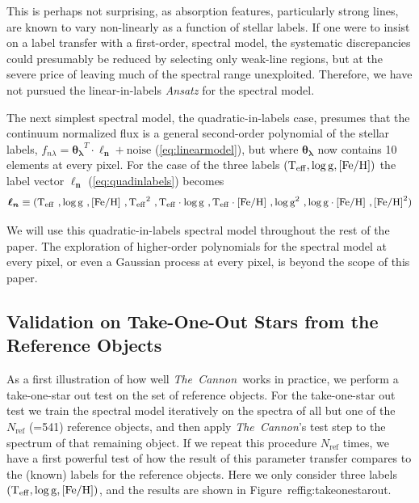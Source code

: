 \documentclass[12pt, preprint]{aastex}
\newcommand{\teff}{\mbox{$\rm T_{eff}$}}
\newcommand{\feh}{\mbox{$\rm [Fe/H]$}}
\newcommand{\logg}{\mbox{$\rm \log g$}}
\newcommand{\tc}{\textsl{The~Cannon}}
\newcommand{\rfn}{\mathrm{ref}}
\begin{document}
This is perhaps not surprising, as absorption features, particularly strong lines, are known to vary non-linearly as a function of stellar labels. If one were to insist on a label transfer with a first-order, spectral model, the systematic discrepancies could presumably be reduced by selecting only weak-line regions, but at the severe price of leaving much of the spectral range unexploited. Therefore, we have not pursued the linear-in-labels \textit{Ansatz} for the spectral model.


The next simplest spectral model, the quadratic-in-labels case,
 presumes that the continuum normalized flux is a general second-order polynomial of the stellar labels, $f_{n\lambda} =
\boldsymbol{\theta_\lambda}^T \cdot \boldsymbol{\ell_n} + \mbox{noise}$ 
(\ref{eq:linearmodel}), 
but where $\boldsymbol{\theta_\lambda}$ now contains 10 elements at every pixel.
For the case of the three labels $(\teff , \logg , \feh)$ the label vector $\boldsymbol{\ell_n}$
(\ref{eq:quadinlabels})
becomes  
\begin{equation}
\boldsymbol{\ell_n}\equiv(\teff\  , \logg\  , \feh\  , \teff^2\ , \teff\cdot \logg\ , \teff \cdot\feh\ , \logg^2 \ , \logg\cdot \feh\  , \feh^2)
 \label{eq:quadin3labels}
 \end{equation}

We will use this quadratic-in-labels spectral model throughout the rest of the paper. 
The exploration of higher-order polynomials for the spectral model at every pixel, or even a Gaussian process at every pixel, is beyond the scope of this paper. 
 
\subsection{Validation on Take-One-Out Stars from the Reference Objects}
\label{sec:take-one-out}

As a first illustration of how well \tc\ works in practice, we perform a take-one-star out test on the set of reference objects.
For the take-one-star out test we train the spectral model iteratively on the spectra of all but one of the $N_\rfn$ (=541) 
reference objects, and then apply \tc 's test step to the spectrum of that remaining object. If we repeat this procedure $N_\rfn$ times, 
we have a first powerful test of how the result of this parameter transfer compares to the (known) labels for the reference objects.
 Here we only consider three labels $(\teff , \logg , \feh)$, and the results are shown in Figure~ref{fig:takeonestarout}.
\end{document}
